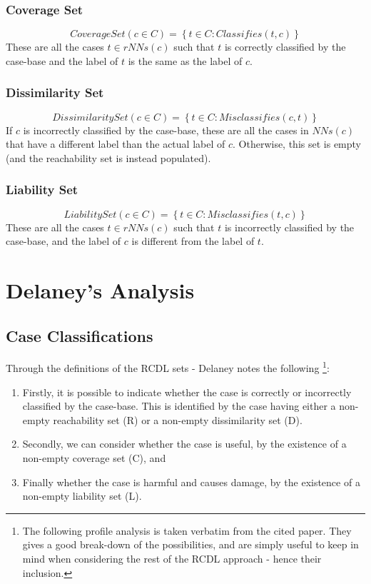\documentclass[a4paper,11pt]{report}
\begin{document}
\subsubsection{Coverage Set}
\[ CoverageSet(c \in C) = \left\lbrace t \in C : Classifies(t, c) \right\rbrace \]
These are all the cases $ t \in rNNs(c) $ such that $t$ is correctly classified by the case-base and the label of $t$ is the same as the label of $c$.

\subsubsection{Dissimilarity Set}
\[ DissimilaritySet(c \in C) = \left\lbrace t \in C : Misclassifies(c, t) \right\rbrace \]  
If $c$ is incorrectly classified by the case-base, these are all the cases in $ NNs(c) $ that have a different label than the actual label of $c$. Otherwise, this set is empty (and the reachability set is instead populated).

\subsubsection{Liability Set}
\[ LiabilitySet(c \in C) = \left\lbrace t \in C : Misclassifies(t, c) \right\rbrace \]  
These are all the cases $ t \in rNNs(c) $ such that $t$ is incorrectly classified by the case-base, and the label of $c$ is different from the label of $t$.

\section{Delaney's Analysis}

\subsection{Case Classifications}
Through the definitions of the RCDL sets - Delaney notes the following \citep{Delany2009}\footnote{The following profile analysis is taken verbatim from the cited paper. They gives a good break-down of the possibilities, and are simply useful to keep in mind when considering the rest of the RCDL approach - hence their inclusion.}:

\begin{enumerate}
	\item Firstly, it is possible to indicate whether the case is correctly or incorrectly classified by the case-base. This is identified by the case having either a non-empty reachability set (R) or a non-empty dissimilarity set (D).
	\item Secondly, we can consider whether the case is useful, by the existence of a non-empty coverage set (C), and
	\item Finally whether the case is harmful and causes damage, by the existence of a non-empty liability set (L).
\end{enumerate}
\end{document}
